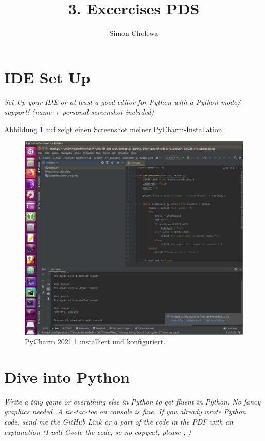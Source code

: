 \documentclass[11pt,a4paper]{article}
\author{Simon Cholewa}
\title{3. Excercises PDS}
\begin{document}
\maketitle

\section{IDE Set Up}
\textit{Set Up your IDE or at least a good editor for Python with a Python mode/ support! (name + personal screenshot included)}

Abbildung \ref{fig:pycharm} auf zeigt einen Screenshot meiner PyCharm-Installation.

\begin{figure}[!htbp] 
	\centering
	\includegraphics[width=1.0\linewidth]{images/PyCharm}
	\caption[PyCharm]{PyCharm 2021.1 installiert und konfiguriert.}
	\label{fig:pycharm}
\end{figure}


\section{Dive into Python}
\textit{Write a tiny game or everything else in Python to get fluent in Python. No fancy graphics needed. A tic-tac-toe on console is fine. If you already wrote Python code, send me the GitHub Link or a part of the code in the PDF with an explanation (I will Goole the code, so no copycat, please ;-)}
\end{document}
